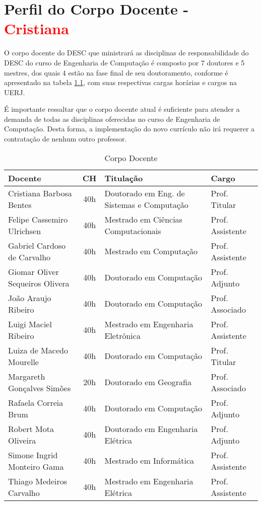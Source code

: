 \chapter{Perfil do Corpo Docente - \textcolor{red}{Cristiana}}

O corpo docente do DESC que ministrará as disciplinas de responsabilidade do DESC do curso de Engenharia de Computação é composto por 7 doutores e 5 mestres, dos quais 4 estão na fase final de seu doutoramento, conforme é apresentado na tabela \ref{CorpoDocente}, com suas respectivas cargas horárias e cargos na UERJ.

É importante ressaltar que o corpo docente atual é suficiente para atender a demanda de todas as disciplinas oferecidas no curso de Engenharia de Computação. Desta forma, a implementação do novo currículo não irá requerer a contratação de nenhum outro professor.

\begin{table}
	\centering
	\caption{Corpo Docente}
	\label{CorpoDocente}
	\begin{tabular}{|l|c|l|l|}
		\hline
		{\textbf{Docente}}                   & \textbf{CH} & \textbf{Titulação}                         & \textbf{Cargo}  \\
		\hline
		Cristiana Barbosa Bentes             & 40h         & Doutorado em Eng. de Sistemas e Computação & Prof. Titular \\
		Felipe Cassemiro Ulrichsen	         & 40h         & Mestrado em Ciências Computacionais      	& Prof. Assistente\\
		Gabriel Cardoso de Carvalho          & 40h         & Mestrado em Computação                     & Prof. Assistente\\
		Giomar Oliver Sequeiros Olivera      & 40h         & Doutorado em Computação                    & Prof. Adjunto   \\
		João Araujo Ribeiro                  & 40h         & Doutorado em Computação                    & Prof. Associado \\
		Luigi Maciel Ribeiro 	             & 40h         & Mestrado em Engenharia Eletrônica          & Prof. Assistente \\
		Luiza de Macedo Mourelle             & 40h         & Doutorado em Computação                    & Prof. Titular \\
		Margareth Gonçalves Simões           & 20h         & Doutorado em Geografia                     & Prof. Associado \\
		Rafaela Correia Brum		         & 40h         & Doutorado em Computação                    & Prof. Adjunto   \\	
		Robert Mota Oliveira		         & 40h         & Doutorado em Engenharia Elétrica           & Prof. Adjunto   \\	
		Simone Ingrid Monteiro Gama		     & 40h         & Mestrado em Informática             		& Prof. Assistente\\	
		Thiago Medeiros Carvalho		     & 40h         & Mestrado em Engenharia Elétrica            & Prof. Assistente\\	
		\hline
	\end{tabular}
\end{table}


